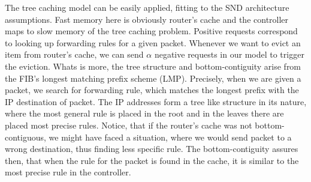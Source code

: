 The tree caching model can be easily applied, fitting to the SND architecture 
assumptions. Fast memory here is obviously router's cache and the 
controller maps to slow memory of the tree caching problem. Positive requests 
correspond to looking up forwarding rules for a given packet. Whenever we want to evict an item from 
router's cache, we can send $\alpha$ negative requests in our model to trigger 
the eviction. Whats is more, the tree structure and bottom-contiguity arise 
from the FIB's longest matching prefix scheme (LMP). Precisely, when we are given a 
packet, we search for forwarding rule, which matches the longest prefix with the 
IP destination of packet. The IP addresses form a tree like 
structure in its nature, where the most general rule is placed in the root and in the leaves 
there are placed most precise rules. Notice, that if the router's cache was not 
bottom-contiguous, we might have faced a situation, where we would send packet to a
wrong destination, thus finding less specific rule. The bottom-contiguity assures then, that when the rule 
for the packet is found in the cache, it is similar to the most precise rule in the
controller.
